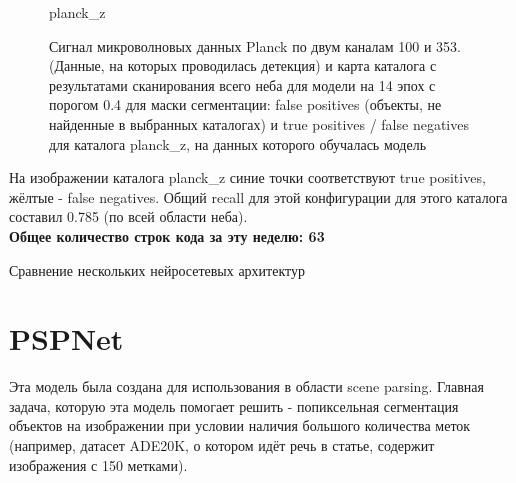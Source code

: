 \documentclass{article}
\begin{document}
\begin{figure}[h]
\begin{minipage}[h]{0.47\linewidth}
    \end{minipage}
\hfill
    \begin{minipage}[h]{0.47\linewidth}
         planck\_z \\
    \end{minipage}
    \caption{Сигнал микроволновых данных Planck по двум каналам 100 и 353. (Данные, на которых
        проводилась детекция) и карта каталога с результатами сканирования всего неба для модели 
        на 14 эпох с порогом 0.4 для маски сегментации: false positives (объекты, не найденные в 
        выбранных каталогах) и true positives / false negatives для каталога planck\_z, на данных 
        которого обучалась модель}
\end{figure}
На изображении каталога planck\_z синие точки соответствуют true positives, жёлтые - false 
negatives. Общий recall для этой конфигурации для этого каталога составил 0.785 (по всей области 
неба).\\
\textbf{Общее количество строк кода за эту неделю: 63}\\

\newpage

\begin{center}{\huge Сравнение нескольких нейросетевых архитектур\\}\end{center}
\section{PSPNet}
Эта модель была создана для использования в области scene parsing. Главная задача, которую эта 
модель помогает решить - попиксельная сегментация объектов на изображении при условии наличия 
большого количества меток (например, датасет ADE20K, о котором идёт речь в статье, содержит 
изображения с 150 метками). \\
\end{document}
